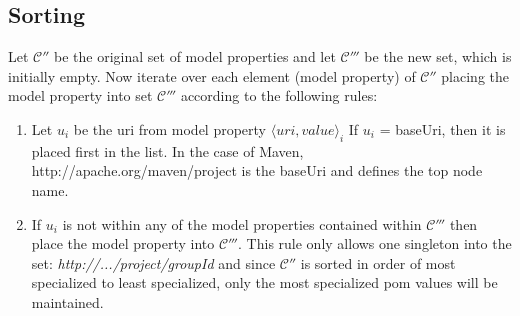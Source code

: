 \documentclass[12pt]{amsart}
\begin{document}
\subsection{Sorting}
Let \begin{math}\mathcal{C''}\end{math} be the original set of model properties and let \begin{math}\mathcal{C'''}\end{math} be the new set, which is initially empty. Now iterate over each element (model property) of \begin{math}\mathcal{C''}\end{math} placing the model property into set  \begin{math}\mathcal{C'''}\end{math}  according to the following rules:
\begin{enumerate}
\item Let \begin{math}u_{i}\end{math} be the uri from  model property \begin{math}\langle uri, value\rangle_{i} \end{math} If  \begin{math}u_{i}\end{math} = baseUri, then it is placed first in the list. In the case of Maven, http://apache.org/maven/project is the baseUri and defines the top node name.
\item If \begin{math}u_{i}\end{math} is not within any of the model properties contained within \begin{math}\mathcal{C'''}\end{math} then place the model property into \begin{math}\mathcal{C'''}\end{math}. This rule only allows one singleton into the set: \emph{http://.../project/groupId} and since \begin{math}\mathcal{C''}\end{math} is sorted in order of most specialized to least specialized, only the most specialized pom values will be maintained.

\end{enumerate}
\end{document}
